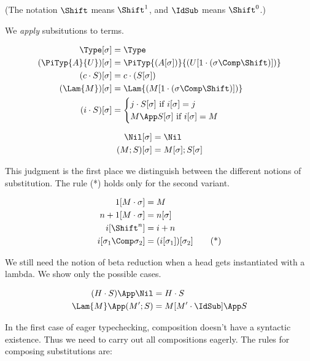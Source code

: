 (The notation $\Shift$ means $\Shift^1$, and $\IdSub$ means $\Shift^0$.)  

We \emph{apply} subsitutions to terms.

\bigskip
{}

\begin{align*} 
\Type\Msub &= \Type \\
(\PiTyp{A}{U})\Msub &= \PiTyp{(A\Msub)}{(U\Ssub)}\\
(c\cdot S)\Msub &= c\cdot (S\Msub) \\
(\Lam{M})\Msub &= \Lam{(M\Ssub)}\\
(i\cdot S)\Msub &= \begin{cases}
                     j\cdot S\Msub \mbox{\ if $i\Msub = j$} \\
                     M \App S\Msub\mbox{\ if $i\Msub = M$}
                   \end{cases} 
\end{align*} 




\begin{align*} 
\Nil\Msub &= \Nil\\
(M;S)\Msub &= M\Msub;S\Msub
\end{align*} 

\bigskip 

This judgment is the first place we distinguish between 
the different notions of substitution.  The rule (*)
holds only for the second variant.

\begin{align*} 
1[M\cdot\sigma] &= M\\
n+1[M\cdot\sigma] &= n[\sigma]\\
i[\Shift^n] &= i+n\\
i[\sigma_1\Comp\sigma_2] &= (i[\sigma_1])[\sigma_2]\tag{*}
\end{align*} 

We still need the notion of beta reduction when a 
head gets instantiated with a lambda.  We show
only the possible cases.

\bigskip 
{}

\begin{align*} 
(H\cdot S)\App\Nil &= H\cdot S\\
\Lam{M}\App(M';S) &= M[M'\cdot\IdSub]\App S
\end{align*} 

In the first case of eager typechecking, composition doesn't
have a syntactic existence.  Thus we need to carry out all 
compositions eagerly.  The rules for composing substitutions are:

